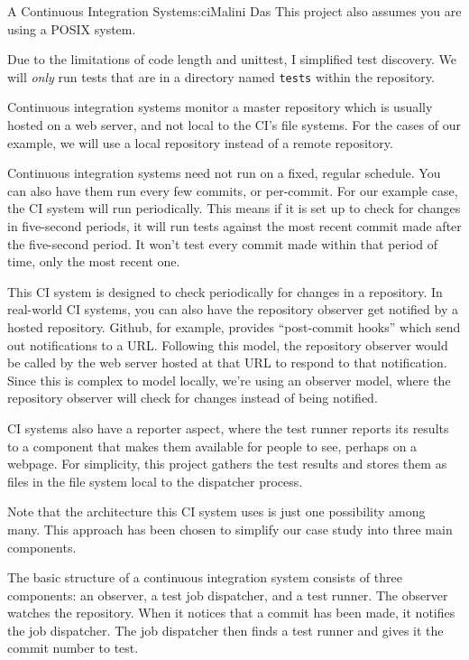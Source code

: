 \begin{aosachapter}{A Continuous Integration System}{s:ci}{Malini Das}
This project also assumes you are using a POSIX system.

Due to the limitations of code length and unittest, I simplified test
discovery. We will \emph{only} run tests that are in a directory named
\texttt{tests} within the repository.

Continuous integration systems monitor a master repository which is
usually hosted on a web server, and not local to the CI's file systems.
For the cases of our example, we will use a local repository instead of
a remote repository.

Continuous integration systems need not run on a fixed, regular
schedule. You can also have them run every few commits, or per-commit.
For our example case, the CI system will run periodically. This means if
it is set up to check for changes in five-second periods, it will run
tests against the most recent commit made after the five-second period.
It won't test every commit made within that period of time, only the
most recent one.

This CI system is designed to check periodically for changes in a
repository. In real-world CI systems, you can also have the repository
observer get notified by a hosted repository. Github, for example,
provides ``post-commit hooks'' which send out notifications to a URL.
Following this model, the repository observer would be called by the web
server hosted at that URL to respond to that notification. Since this is
complex to model locally, we're using an observer model, where the
repository observer will check for changes instead of being notified.

CI systems also have a reporter aspect, where the test runner reports
its results to a component that makes them available for people to see,
perhaps on a webpage. For simplicity, this project gathers the test
results and stores them as files in the file system local to the
dispatcher process.

Note that the architecture this CI system uses is just one possibility
among many. This approach has been chosen to simplify our case study
into three main components.

\label{introduction}

The basic structure of a continuous integration system consists of three
components: an observer, a test job dispatcher, and a test runner. The
observer watches the repository. When it notices that a commit has been
made, it notifies the job dispatcher. The job dispatcher then finds a
test runner and gives it the commit number to test.


\end{aosachapter}
